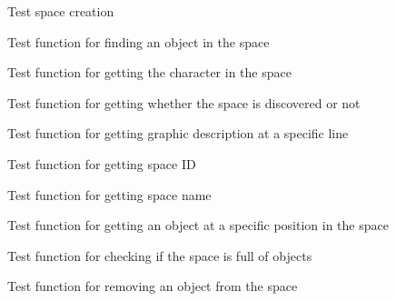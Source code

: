 \begin{DoxyRefList}
%
Test space creation  
\item[Global \doxylink{space__test_8c_a505ff5a86df885d56247ce4bb4c897b4}{test2\+\_\+space\+\_\+find\+\_\+object} ()]\label{test__test000207}%
%
Test function for finding an object in the space  
\item[Global \doxylink{space__test_8c_a265ce3822740dbbd82b847437ff415ea}{test2\+\_\+space\+\_\+get\+\_\+character} ()]\label{test__test000216}%
%
Test function for getting the character in the space  
\item[Global \doxylink{space__test_8c_a64ea5465e55d87db62b95d88d6ecfb69}{test2\+\_\+space\+\_\+get\+\_\+discovered} ()]\label{test__test000196}%
%
Test function for getting whether the space is discovered or not  
\item[Global \doxylink{space__test_8c_a07881113223758e52e3ded3ea416b978}{test2\+\_\+space\+\_\+get\+\_\+gdesc\+\_\+at} ()]\label{test__test000201}%
%
Test function for getting graphic description at a specific line  
\item[Global \doxylink{space__test_8c_af9087176b0d3c41d83a17a4918b13e31}{test2\+\_\+space\+\_\+get\+\_\+id} ()]\label{test__test000192}%
%
Test function for getting space ID  
\item[Global \doxylink{space__test_8c_aee88ed31c63efc674051a4563aed86e2}{test2\+\_\+space\+\_\+get\+\_\+name} ()]\label{test__test000194}%
%
Test function for getting space name  
\item[Global \doxylink{space__test_8c_af2f72986dc048e9221ee9d00379b87c2}{test2\+\_\+space\+\_\+get\+\_\+object\+\_\+at\+\_\+pos} ()]\label{test__test000210}%
%
Test function for getting an object at a specific position in the space  
\item[Global \doxylink{space__test_8c_a58fa377888060f04809b114577dddd8e}{test2\+\_\+space\+\_\+is\+\_\+full} ()]\label{test__test000212}%
%
Test function for checking if the space is full of objects  
\item[Global \doxylink{space__test_8c_a8f53f80be6eeff3b6e2fd0ce6b6ea310}{test2\+\_\+space\+\_\+remove\+\_\+object} ()]\label{test__test000205}%
%
Test function for removing an object from the space  
\item[Global \doxylink{space__test_8c_a8e7d3726a7551c0de5825cc882836a71}{test2\+\_\+space\+\_\+set\+\_\+character} ()]\label{test__test000214}%

\end{DoxyRefList}
